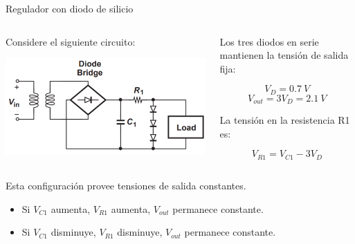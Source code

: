 \documentclass[t,aspectratio=169]{beamer}
\begin{document}
\begin{frame}{Regulador con diodo de silicio}

\begin{columns}
\begin{column}{0.5\textwidth}
    Considere el siguiente circuito:
    
    \vspace{5mm}\includegraphics[width=\textwidth]{figures/rectifier_with_regulator.png}
\end{column}
\begin{column}{0.5\textwidth}
    Los tres diodos en serie mantienen la tensión de salida fija:

    \[ V_D = 0.7\ V \]
    \[ V_{out} = 3 V_D = 2.1\ V \]

    \vspace{5mm}La tensión en la resistencia R1 es:

    \[ V_{R1} = V_{C1} - 3V_D  \]
\end{column}
\end{columns}

\vspace{5mm}Esta configuración provee tensiones de salida constantes.

\begin{itemize}
    \item Si $V_{C1}$ aumenta, $V_{R1}$ aumenta, $V_{out}$ permanece constante.
    \item Si $V_{C1}$ disminuye, $V_{R1}$ disminuye, $V_{out}$ permanece constante.
\end{itemize}

\end{frame}
\end{document}
